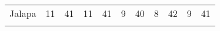 {\begin{tabular}[t]{ccccccccccc}
Jalapa & 11 & 41 & 11 & 41 & 9 & 40 & 8 & 42 & 9 & 41\\
\cellcolor[HTML]{B6B3FF}{Jutiapa} & \cellcolor[HTML]{B6B3FF}{9} & \cellcolor[HTML]{B6B3FF}{39} & \cellcolor[HTML]{B6B3FF}{19} & \cellcolor[HTML]{B6B3FF}{39} & \cellcolor[HTML]{B6B3FF}{10} & \cellcolor[HTML]{B6B3FF}{41} & \cellcolor[HTML]{B6B3FF}{9} & \cellcolor[HTML]{B6B3FF}{49} & \cellcolor[HTML]{B6B3FF}{12} & \cellcolor[HTML]{B6B3FF}{49}\\
\bottomrule
\end{tabular}
}